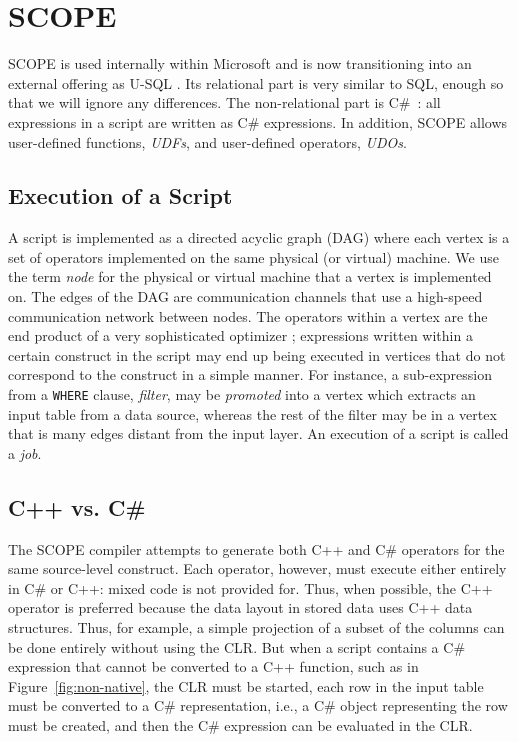 \section{SCOPE \label{sec:Scope}}

SCOPE \cite{} is used internally within Microsoft and is now transitioning into an external offering as U-SQL \cite{}.
Its relational part is very similar to SQL, enough so that we will ignore any differences.
The non-relational part is C\#~\cite{}: all expressions in a script are written as C\# expressions.
In addition, SCOPE allows user-defined functions, {\em UDFs}, and user-defined operators, {\em UDOs}.

\subsection{Execution of a Script}
A script is implemented as a directed acyclic graph (DAG) where each vertex is a set of operators implemented on the same physical (or virtual) machine. We use the term {\it node} for the physical or virtual machine that a vertex is implemented on.
The edges of the DAG are communication channels that use a high-speed communication network between nodes.
The operators within a vertex are the end product of a very sophisticated optimizer \cite{}; expressions written within a certain construct in the script may end up being executed in vertices that do not correspond to the construct in a simple manner.
For instance, a sub-expression from a {\tt WHERE} clause, {\em filter}, may be {\it promoted} into a vertex which extracts an input table from a data source, whereas the rest of the filter may be in a vertex that is many edges distant from the input layer.
An execution of a script is called a {\em job}.

\subsection{C++ vs. C\#}
The SCOPE compiler attempts to generate both C++ and C\# operators for the same source-level construct.
Each operator, however, must execute either entirely in C\# or C++: mixed code is not provided for.
Thus, when possible, the C++ operator is preferred because the data layout in stored data uses C++ data structures.
Thus, for example, a simple projection of a subset of the columns can be done entirely
without using the CLR.
But when a script contains a C\# expression that cannot be converted to a C++ function, such as in Figure~\ref{fig:non-native}, the CLR must be started, each row in the input table must be converted to a C\# representation, i.e., a C\# object representing the row must be created, and then the C\# expression can be evaluated in the CLR.

